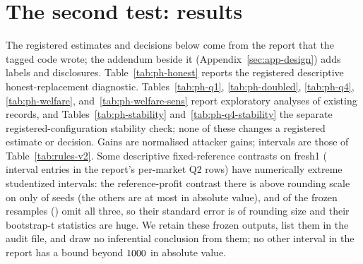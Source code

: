 \documentclass[11pt]{article}
\begin{document}
\section{The second test: results}\label{sec:results}
The registered estimates and decisions below come from the report that the tagged code wrote; the addendum beside it (Appendix~\ref{sec:app-design}) adds labels and disclosures. Table~\ref{tab:ph-honest} reports the registered descriptive honest-replacement diagnostic. Tables~\ref{tab:ph-q1}, \ref{tab:ph-doubled}, \ref{tab:ph-q4}, \ref{tab:ph-welfare}, and~\ref{tab:ph-welfare-sens} report exploratory analyses of existing records, and Tables~\ref{tab:ph-stability} and~\ref{tab:ph-q4-stability} the separate registered-configuration stability check; none of these changes a registered estimate or decision. Gains are normalised attacker gains; intervals are those of Table~\ref{tab:rules-v2}. Some descriptive fixed-reference contrasts on fresh1 ( interval entries in the report's per-market Q2 rows) have numerically extreme studentized intervals: the reference-profit contrast there is above rounding scale on only  of  seeds (the others are at most  in absolute value), and  of the  frozen resamples () omit all three, so their standard error is of rounding size and their bootstrap-t statistics are huge. We retain these frozen outputs, list them in the audit file, and draw no inferential conclusion from them; no other interval in the report has a bound beyond $1000$ in absolute value.
\end{document}
